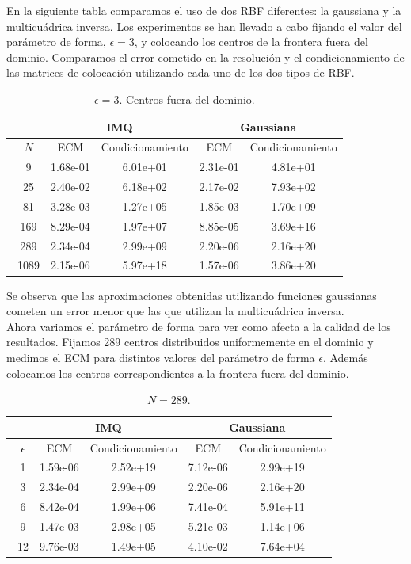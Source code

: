 \documentclass[11pt,a4paper]{article}
\begin{document}
En la siguiente tabla comparamos el uso de dos RBF diferentes: la gaussiana y la multicuádrica inversa. Los experimentos se han llevado a cabo fijando el valor del parámetro de forma, $\epsilon=3$, y colocando los centros de la frontera fuera del dominio.  Comparamos el error cometido en la resolución y el condicionamiento de las matrices de colocación utilizando cada uno de los dos tipos de RBF. 
\begin{table}[H]
\centering
\caption{ $\epsilon=3$. Centros fuera del dominio. }
\begin{tabular}{|c|cc|cc|}
\hline
\ & \multicolumn{2}{|c|}{IMQ} & \multicolumn{2}{|c|}{Gaussiana} \\
\hline
\ $N$& ECM & Condicionamiento & ECM & Condicionamiento \\
\hline
\ 9 &   1.68e-01 & 6.01e+01 &2.31e-01&4.81e+01\\
\ 25 &   2.40e-02 &6.18e+02 & 2.17e-02&7.93e+02 \\
\ 81 &   3.28e-03 & 1.27e+05&1.85e-03&1.70e+09 \\
\ 169 &  8.29e-04&1.97e+07&8.85e-05&3.69e+16  \\
\ 289 &  2.34e-04&2.99e+09 &2.20e-06&2.16e+20 \\
\ 1089 & 2.15e-06 &5.97e+18&1.57e-06&  3.86e+20\\
\hline
\end{tabular}
\end{table}
Se observa que las aproximaciones obtenidas utilizando funciones gaussianas cometen un error menor que las que utilizan la multicuádrica inversa. \\
Ahora variamos el parámetro de forma para ver como afecta a la calidad de los resultados. Fijamos 289 centros distribuidos uniformemente en el dominio y medimos el ECM para distintos valores del parámetro de forma $\epsilon$. Además colocamos los centros correspondientes a la frontera fuera del dominio. 

\begin{table}[H]
\centering
\caption{$N=289$.}
\begin{tabular}{|c|cc|cc|}
\hline
\ & \multicolumn{2}{|c|}{IMQ} & \multicolumn{2}{|c|}{Gaussiana} \\
\hline
\ $\epsilon$& ECM & Condicionamiento & ECM & Condicionamiento \\
\hline
\ 1 & 1.59e-06   &2.52e+19  & 7.12e-06& 2.99e+19\\
\ 3 &  2.34e-04  &2.99e+09 & 2.20e-06& 2.16e+20\\
\ 6 &  8.42e-04  & 1.99e+06&  7.41e-04&5.91e+11 \\
\ 9 & 1.47e-03 &2.98e+05& 5.21e-03&1.14e+06  \\
\ 12& 9.76e-03&1.49e+05  & 4.10e-02&7.64e+04 \\

\hline
\end{tabular}
\label{comparacion eps}
\end{table}
\end{document}

